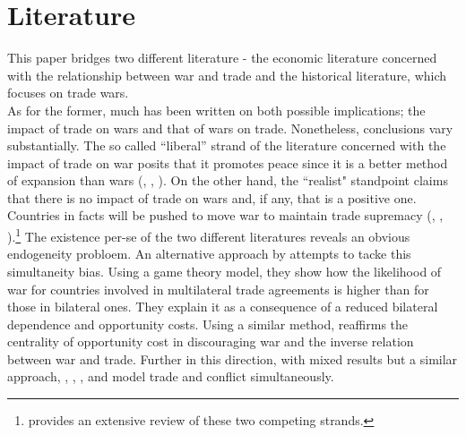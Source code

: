 \documentclass[12pt,a4paper,notitlepage,english]{article}
\begin{document}
\section{Literature} \label{literature}
This paper bridges two different literature - the economic literature concerned with the relationship between war and trade and the historical literature, which focuses on trade wars. \\
As for the former, much has been written on both possible implications; the impact of trade on wars and that of wars on trade. Nonetheless, conclusions vary substantially. The so called ``liberal'' strand of the literature concerned with the impact of trade on war posits that it promotes peace since it is a better method of expansion than wars (\cite{Doyle1997}, \cite{Oneal1997}, \cite{Polachek1980}). On the other hand, the ``realist" standpoint claims that there is no impact of trade on wars and, if any, that is a positive one. Countries in facts will be pushed to move war to maintain trade supremacy (\cite{Ripsman1996}, \cite{Levy1990}, \cite{Buzan1984}).\footnote{\cite{Mcmillan1997} provides an extensive review of these two competing strands.} 
The existence per-se of the two different literatures reveals an obvious endogeneity probloem. An alternative approach by \cite{Martin2008} attempts to tacke this simultaneity bias. Using a game theory model, they show how the likelihood of war for countries involved in multilateral trade agreements is higher than for those in bilateral ones. They explain it as a consequence of a reduced bilateral dependence and opportunity costs. Using a similar method, \cite{polachek2010opportunity} reaffirms the centrality of opportunity cost in discouraging war and the inverse relation between war and trade. Further in this direction, with mixed results but a similar approach, \cite{kim1998phd}, \cite{keshk2004trade}, \cite{hegre2010trade}, \cite{goenner2011simultaneity} and \cite{leonard2020containing} model trade and conflict simultaneously. 
\end{document}
